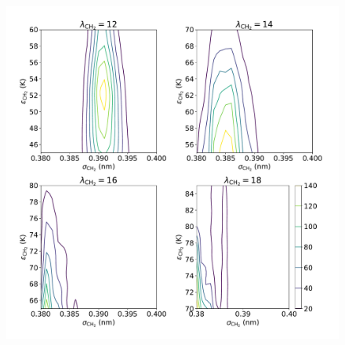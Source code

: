 \documentclass[journal=jced,manuscript=article]{achemso}
\begin{document}
	\begin{figure}[htb!]
		\centering
		\includegraphics[width=6.4in]{CYC6_Neff_lam.pdf}
		\caption{}
		\label{fig:Neff_CYC6}
	\end{figure}
\end{document}

